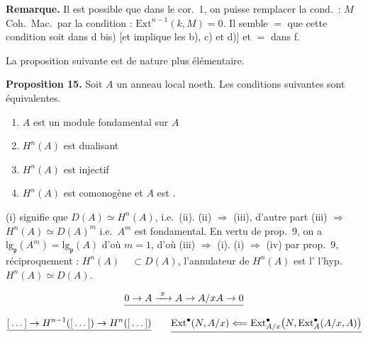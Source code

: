 \documentclass[11pt,a4paper]{article}
\begin{document}
\textbf{Remarque.} Il est possible que dans le cor.\ 1, on
puisse remplacer  la cond.\ : $M$
Coh.\ Mac.\ par la condition :
$\mathrm{Ext}^{n-1}(k, M) = 0$. Il semble $=$ que cette
condition soit  dans
d bis) 
[et implique les b), c) et
d)] \struck{\ill{}} et $=$ dans f.

La proposition suivante est de nature plus élémentaire.

\textbf{Proposition 15.} Soit $A$ un anneau local noeth. Les conditions
suivantes sont équivalentes.
\begin{enumerate}
  \item[(a)] $A$ est un module fondamental sur $A$
  \item[(b)] $H^n(A)$ est dualisant
  \item[(c)] $H^n(A)$ est injectif
  \item[(d)] $H^n(A)$ est comonogène et $A$ est
    .
\end{enumerate}

(i) signifie que $D(A) \simeq H^n(A)$, i.e.\ (ii).
(ii) $\Rightarrow$ (iii), d'autre part (iii) $\Rightarrow$
$H^n(A) \simeq D(A)^m$ i.e.\ $A^m$ est 
fondamental. En vertu de prop.\ 9, on a
$\mathrm{lg}_{\mathfrak{p}}(A^m) = \mathrm{lg}_{\mathfrak{p}}(A)$
d'où $m = 1$, d'où (iii) $\Rightarrow$ (i).
 
(i) $\Rightarrow$ (iv) par prop.\ 9, réciproquement : $H^n(A)$
\ \ill{} $\subset D(A)$, l'annulateur
de $H^n(A)$ est   l'\ill{} \ill{} l'hyp.\ \ill{}
$H^n(A) \simeq D(A)$.



\[
  \struck{0 \to A \xrightarrow{\ x\ } A \to A/xA \to 0}
\]
\[
  \struck{\ill{} \to H^{n-1}(\ill{}) \to H^n(\ill{})}
  \qquad
  \struck{\mathrm{Ext}^{\bullet}(N, A/x) \Longleftarrow
  \mathrm{Ext}^{\bullet}_{A/x}\bigl(N, \mathrm{Ext}^{\bullet}_A(A/x, A)\bigr)}
\]
 \ill{} \ill{}
\end{document}
